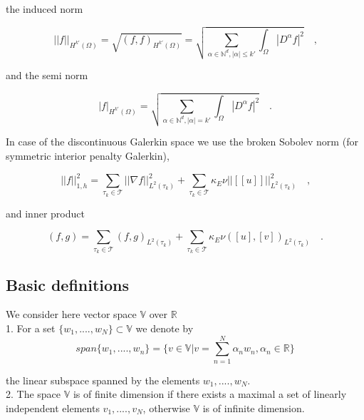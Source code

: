 \documentclass[a4paper,twoside,openright]{book}
\begin{document}
\begin{appendices}
the induced norm 

\begin{equation}
||f||_{H^{k'} (\Omega)} = \sqrt{(f,f)_{H^{k'}(\Omega)}} = \sqrt{\sum_{\alpha \in \mathbb{N}^d, |\alpha| \leq k'} \int_\Omega |D^\alpha f|^2} \quad \textrm{,}
\end{equation}

and the semi norm 

\begin{equation}
|f|_{H^{k'} (\Omega)} = \sqrt{\sum_{\alpha \in \mathbb{N}^d, |\alpha| = k'} \int_\Omega |D^\alpha f|^2} \quad \textrm{.}
\end{equation}

In case of the discontinuous Galerkin space we use the broken Sobolev norm (for symmetric interior penalty Galerkin), \cite{Montlaur2}

\begin{equation}
||f||_{1,h}^2 = \sum_{\tau_k \in \mathcal{T}} ||\nabla f||_{L^2(\tau_k)}^2 + \sum_{\tau_k \in \mathcal{T}} \kappa_E \nu ||[[u]]||_{L^2 (\tau_k)}^2 \quad \textrm{,}
\end{equation}

and inner product

\begin{equation}
(f,g) = \sum_{\tau_k \in \mathcal{T}} (f,g)_{L^2(\tau_k)} + \sum_{\tau_k \in \mathcal{T}} \kappa_E \nu ([u],[v])_{L^2 (\tau_k)} \quad \textrm{.}
\end{equation}

\subsection{Basic definitions}

We consider here vector space $\mathbb{V}$ over $\mathbb{R}$\\

1. For a set $\lbrace w_1,....,w_N \rbrace \subset \mathbb{V}$ we denote by \\
\begin{equation} \label{vector space}
span \lbrace w_1,....,w_n \rbrace = \lbrace v \in \mathbb{V} | v = \sum_{n=1}^N \alpha_n w_n, \alpha_n \in \mathbb{R} \rbrace
\end{equation} 

the linear subspace spanned by the elements $w_1,....,w_N$.\\

2. The space $\mathbb{V}$ is of finite dimension if there exists a maximal a set of linearly independent elements $v_1,....,v_N$, otherwise $\mathbb{V}$ is of infinite dimension.\\


\end{appendices}
\end{document}
